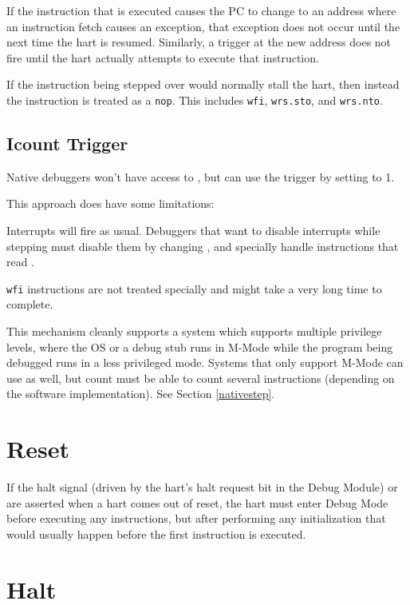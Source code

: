If the instruction that is executed causes the PC to change to an address where
an instruction fetch causes an exception, that exception does not occur until
the next time the hart is resumed. Similarly, a trigger at the new address does
not fire until the hart actually attempts to execute that instruction.

If the instruction being stepped over would normally stall the hart, then
instead the instruction is treated as a {\tt nop}. This includes {\tt wfi},
{\tt wrs.sto}, and {\tt wrs.nto}.

\subsection{Icount Trigger} \label{stepIcount}

Native debuggers won't have access to \RcsrDcsr, but can use the \RcsrIcount
trigger by setting \FcsrIcountCount to 1.

\begin{steps}{This approach does have some limitations:}
    \item Interrupts will fire as usual. Debuggers that want to disable
        interrupts while stepping must disable them by changing \Rmstatus, and
        specially handle instructions that read \Rmstatus.
    \item {\tt wfi} instructions are not treated specially and might take a
        very long time to complete.
\end{steps}

This mechanism cleanly supports a system which supports multiple privilege
levels, where the OS or a debug stub runs in M-Mode while the program being
debugged runs in a less privileged mode. Systems that only support M-Mode can
use \RcsrIcount as well, but count must be able to count several instructions
(depending on the software implementation). See Section \ref{nativestep}.

\section{Reset}

If the halt signal (driven by the hart's halt request bit in the Debug Module)
or \Fresethaltreq are asserted when a hart comes out of reset, the hart must
enter Debug Mode before executing any instructions, but after performing any
initialization that would usually happen before the first instruction is
executed.

\section{Halt}

